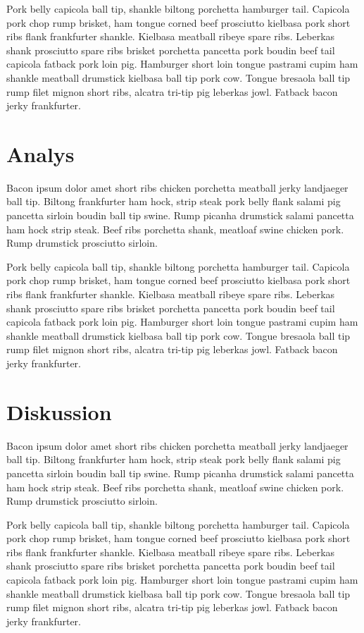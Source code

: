 \documentclass[10pt, titlepage, oneside, a4paper]{article}
\begin{document}
Pork belly capicola ball tip, shankle biltong porchetta hamburger tail. Capicola pork chop rump brisket, ham tongue corned beef prosciutto kielbasa pork short ribs flank frankfurter shankle. Kielbasa meatball ribeye spare ribs. Leberkas shank prosciutto spare ribs brisket porchetta pancetta pork boudin beef tail capicola fatback pork loin pig. Hamburger short loin tongue pastrami cupim ham shankle meatball drumstick kielbasa ball tip pork cow. Tongue bresaola ball tip rump filet mignon short ribs, alcatra tri-tip pig leberkas jowl. Fatback bacon jerky frankfurter.
	\section{Analys}
        Bacon ipsum dolor amet short ribs chicken porchetta meatball jerky landjaeger ball tip. Biltong frankfurter ham hock, strip steak pork belly flank salami pig pancetta sirloin boudin ball tip swine. Rump picanha drumstick salami pancetta ham hock strip steak. Beef ribs porchetta shank, meatloaf swine chicken pork. Rump drumstick prosciutto sirloin.

Pork belly capicola ball tip, shankle biltong porchetta hamburger tail. Capicola pork chop rump brisket, ham tongue corned beef prosciutto kielbasa pork short ribs flank frankfurter shankle. Kielbasa meatball ribeye spare ribs. Leberkas shank prosciutto spare ribs brisket porchetta pancetta pork boudin beef tail capicola fatback pork loin pig. Hamburger short loin tongue pastrami cupim ham shankle meatball drumstick kielbasa ball tip pork cow. Tongue bresaola ball tip rump filet mignon short ribs, alcatra tri-tip pig leberkas jowl. Fatback bacon jerky frankfurter.
    \section{Diskussion}
        Bacon ipsum dolor amet short ribs chicken porchetta meatball jerky landjaeger ball tip. Biltong frankfurter ham hock, strip steak pork belly flank salami pig pancetta sirloin boudin ball tip swine. Rump picanha drumstick salami pancetta ham hock strip steak. Beef ribs porchetta shank, meatloaf swine chicken pork. Rump drumstick prosciutto sirloin.

Pork belly capicola ball tip, shankle biltong porchetta hamburger tail. Capicola pork chop rump brisket, ham tongue corned beef prosciutto kielbasa pork short ribs flank frankfurter shankle. Kielbasa meatball ribeye spare ribs. Leberkas shank prosciutto spare ribs brisket porchetta pancetta pork boudin beef tail capicola fatback pork loin pig. Hamburger short loin tongue pastrami cupim ham shankle meatball drumstick kielbasa ball tip pork cow. Tongue bresaola ball tip rump filet mignon short ribs, alcatra tri-tip pig leberkas jowl. Fatback bacon jerky frankfurter.
\end{document}
